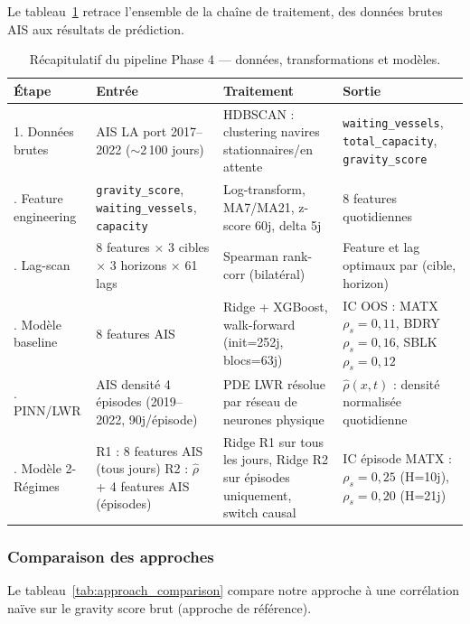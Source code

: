 Le tableau~\ref{tab:pipeline_recap} retrace l'ensemble de la chaîne de
traitement, des données brutes AIS aux résultats de prédiction.

\begin{table}[ht]
\centering
\caption{Récapitulatif du pipeline Phase 4 --- données, transformations et modèles.}
\label{tab:pipeline_recap}
\small
\begin{tabular}{p{2.8cm}p{3.5cm}p{3.5cm}p{3.5cm}}
\toprule
\textbf{Étape} & \textbf{Entrée} & \textbf{Traitement} & \textbf{Sortie} \\
\midrule
1. Données brutes &
AIS LA port 2017--2022 ($\sim$2\,100 jours) &
HDBSCAN : clustering navires stationnaires/en attente &
\texttt{waiting\_vessels}, \texttt{total\_capacity}, \texttt{gravity\_score} \\
\addlinespace
2. Feature engineering &
\texttt{gravity\_score}, \texttt{waiting\_vessels}, \texttt{capacity} &
Log-transform, MA7/MA21, z-score 60j, delta 5j &
8 features quotidiennes \\
\addlinespace
3. Lag-scan &
8 features $\times$ 3 cibles $\times$ 3 horizons $\times$ 61 lags &
Spearman rank-corr (bilatéral) &
Feature et lag optimaux par (cible, horizon) \\
\addlinespace
4. Modèle baseline &
8 features AIS &
Ridge + XGBoost, walk-forward (init=252j, blocs=63j) &
IC OOS : MATX $\rho_s=0{,}11$, BDRY $\rho_s=0{,}16$, SBLK $\rho_s=0{,}12$ \\
\addlinespace
5. PINN/LWR &
AIS densité 4 épisodes (2019--2022, 90j/épisode) &
PDE LWR résolue par réseau de neurones physique &
$\hat{\rho}(x,t)$ : densité normalisée quotidienne \\
\addlinespace
6. Modèle 2-Régimes &
R1 : 8 features AIS (tous jours) \newline R2 : $\hat{\rho}$ + 4 features AIS (épisodes) &
Ridge R1 sur tous les jours, Ridge R2 sur épisodes uniquement, switch causal &
IC épisode MATX : $\rho_s=0{,}25$ (H=10j), $\rho_s=0{,}20$ (H=21j) \\
\bottomrule
\end{tabular}
\end{table}

\subsubsection{Comparaison des approches}

Le tableau~\ref{tab:approach_comparison} compare notre approche à une
corrélation naïve sur le gravity score brut (approche de référence).

